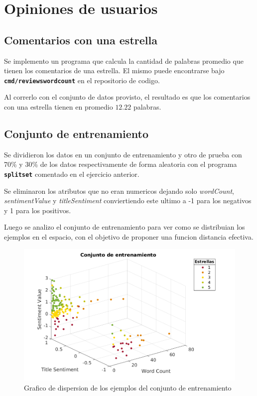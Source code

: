 \documentclass[a4paper]{article}
\newcommand{\bold}[1]{\textbf{\texttt{#1}}}
\begin{document}
\newpage

\section{Opiniones de usuarios}

\subsection{Comentarios con una estrella}
Se implemento un programa que calcula la cantidad de palabras promedio que tienen los comentarios de una estrella. El mismo puede encontrarse bajo \bold{cmd/reviewswordcount} en el repositorio de codigo.

Al correrlo con el conjunto de datos provisto, el resultado es que los comentarios con una estrella tienen en promedio $12.22$ palabras.

\subsection{Conjunto de entrenamiento}
Se dividieron los datos en un conjunto de entrenamiento y otro de prueba con 70\% y 30\% de los datos respectivamente de forma aleatoria con el programa \bold{splitset} comentado en el ejercicio anterior.

Se eliminaron los atributos que no eran numericos dejando solo \textit{wordCount}, \textit{sentimentValue} y \textit{titleSentiment} conviertiendo este ultimo a -1 para los negativos y 1 para los positivos.

Luego se analizo el conjunto de entrenamiento para ver como se distribuian los ejemplos en el espacio, con el objetivo de proponer una funcion distancia efectiva.

\begin{figure}[h]
  \centering
    \includegraphics[scale=0.5]{img/knn-training-set-scatter.png}
  \caption{Grafico de dispersion de los ejemplos del conjunto de entrenamiento}
  \label{fig:ej3-scatter-training}
\end{figure}
\end{document}
